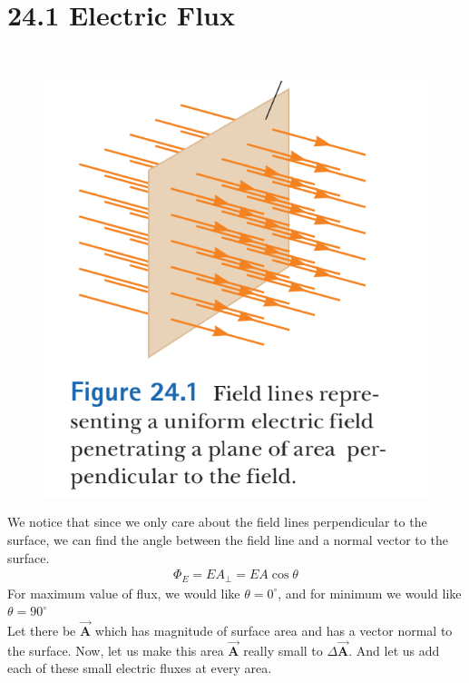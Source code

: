 \documentclass[12pt, titlepage, oneside]{article}
\let\oldvec\vec
\renewcommand{\vec}[1]{\oldvec{\bm{#1}}}
\begin{document}
\section*{24.1 Electric Flux}
\noindent{}
\\ \vspace{0.5cm}

\begin{figure}
\begin{center}
	\includegraphics[scale=0.5]{1.png}
\end{center}
\end{figure}
We notice that since we only care about the field lines perpendicular to the surface, we can find the angle between the field line and a normal vector to the surface. 
\begin{align*}
	\Phi_E = EA_{\perp} = EA \cos \theta
\end{align*}
For maximum value of flux, we would like $\theta = 0^{\circ}$, and for minimum we would like $\theta = 90^{\circ}$\\
Let there be $\vec{A}$ which has magnitude of surface area and has a vector normal to the surface. Now, let us make this area $\vec{A}$ really small to $\Delta \vec{A}$. And let us add each of these small electric fluxes at every area.
\end{document}

